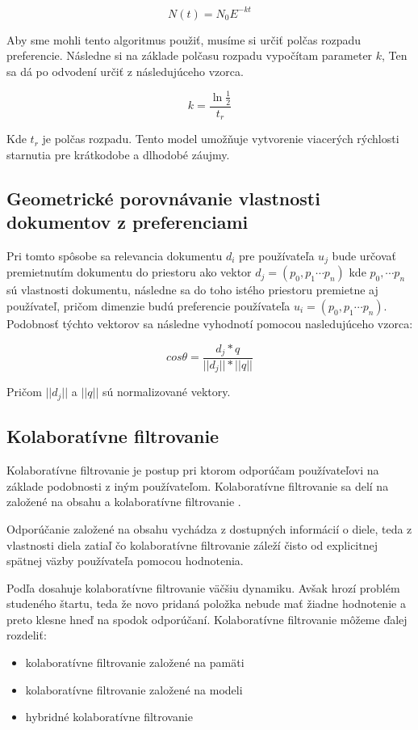 \[N(t) = N_0E^{-kt}\]

Aby sme mohli tento algoritmus použiť, musíme si určiť polčas rozpadu preferencie. Následne si na základe polčasu rozpadu vypočítam parameter \(k\), Ten sa dá po odvodení určiť z následujúceho vzorca.

\[k = \frac{\ln{\frac{1}{2}}}{t_r}\]\cite{7}

Kde \(t_r\) je polčas rozpadu. Tento model umožňuje vytvorenie viacerých rýchlosti starnutia pre krátkodobe a dlhodobé záujmy\cite{8}.


\subsection{Geometrické porovnávanie vlastnosti dokumentov z preferenciami}

Pri tomto spôsobe sa relevancia dokumentu \(d_i\) pre používateľa \(u_j\) bude určovať premietnutím dokumentu do priestoru ako vektor \(d_j=(p_0, p_1\cdots p_n)\) kde \(p_0, \cdots p_n\) sú vlastnosti dokumentu, následne sa do toho istého priestoru premietne aj používateľ, pričom dimenzie budú preferencie používateľa \(u_i=(p_0, p_1 \cdots p_n)\). Podobnosť týchto vektorov sa následne vyhodnotí pomocou nasledujúceho vzorca:

\[cos \theta = \frac{d_j * q}{||d_j||*||q||}\]

Pričom \(||d_j||\) a \(||q||\) sú normalizované vektory\cite{9}.


\subsection{Kolaboratívne filtrovanie}

Kolaboratívne filtrovanie je postup pri ktorom odporúčam používateľovi na základe podobnosti z iným používateľom. Kolaboratívne filtrovanie sa delí na založené na obsahu a kolaboratívne filtrovanie  \cite{10}.

Odporúčanie založené na obsahu vychádza z dostupných informácií o diele, teda z vlastnosti diela zatiaľ čo kolaboratívne filtrovanie záleží čisto od explicitnej spätnej väzby používateľa pomocou hodnotenia.

Podľa \cite{10} dosahuje kolaboratívne filtrovanie väčšiu dynamiku. Avšak hrozí problém studeného štartu, teda že novo pridaná položka nebude mať žiadne hodnotenie a preto klesne hneď na spodok odporúčaní. Kolaboratívne filtrovanie môžeme ďalej rozdeliť:

\begin{itemize}
\item{kolaboratívne filtrovanie založené na pamäti}
\item{kolaboratívne filtrovanie založené na modeli}
\item{hybridné kolaboratívne filtrovanie \cite{11}}
\end{itemize}

